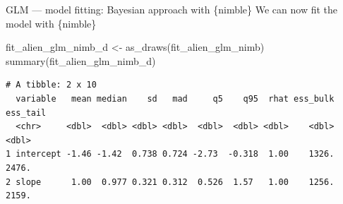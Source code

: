 \documentclass[
  10pt,
  ignorenonframetext,
  aspectratio=169,
  t]{beamer}
\newenvironment{Shaded}{\begin{snugshade}}{\end{snugshade}}
\newcommand{\AttributeTok}[1]{\textcolor[rgb]{0.40,0.45,0.13}{#1}}
\newcommand{\DecValTok}[1]{\textcolor[rgb]{0.68,0.00,0.00}{#1}}
\newcommand{\FunctionTok}[1]{\textcolor[rgb]{0.28,0.35,0.67}{#1}}
\newcommand{\NormalTok}[1]{\textcolor[rgb]{0.00,0.23,0.31}{#1}}
\newcommand{\OtherTok}[1]{\textcolor[rgb]{0.00,0.23,0.31}{#1}}
\newcommand{\SpecialCharTok}[1]{\textcolor[rgb]{0.37,0.37,0.37}{#1}}
\begin{document}
\begin{frame}[fragile]{GLM --- model fitting: Bayesian approach with
\{nimble\}}
\protect{}\label{glm-model-fitting-bayesian-approach-with-nimble-1}
We can now fit the model with \{nimble\}

\vspace{1em}

\footnotesize

\begin{Shaded}
\end{Shaded}

\normalsize

\footnotesize

\begin{Shaded}
\begin{Highlighting}[]
\NormalTok{fit\_alien\_glm\_nimb\_d }\OtherTok{\textless{}{-}} \FunctionTok{as\_draws}\NormalTok{(fit\_alien\_glm\_nimb)}
\FunctionTok{summary}\NormalTok{(fit\_alien\_glm\_nimb\_d)}
\end{Highlighting}
\end{Shaded}

\begin{verbatim}
# A tibble: 2 x 10
  variable   mean median    sd   mad     q5    q95  rhat ess_bulk ess_tail
  <chr>     <dbl>  <dbl> <dbl> <dbl>  <dbl>  <dbl> <dbl>    <dbl>    <dbl>
1 intercept -1.46 -1.42  0.738 0.724 -2.73  -0.318  1.00    1326.    2476.
2 slope      1.00  0.977 0.321 0.312  0.526  1.57   1.00    1256.    2159.
\end{verbatim}

\normalsize
\end{frame}
\end{document}
